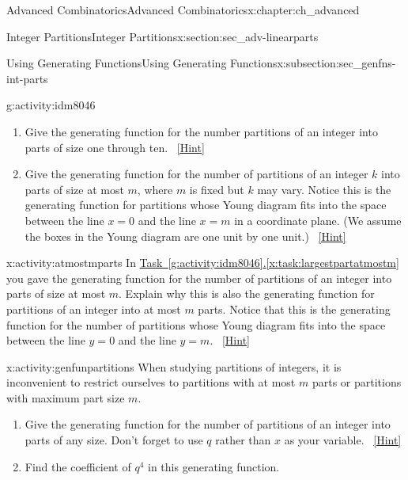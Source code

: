 \documentclass[oneside,10pt,]{book}
\numberwithin{equation}{chapter}
\begin{document}
\begin{chapterptx}{Advanced Combinatorics}{}{Advanced Combinatorics}{}{}{x:chapter:ch_advanced}
\begin{sectionptx}{Integer Partitions}{}{Integer Partitions}{}{}{x:section:sec_adv-linearparts}
\begin{subsectionptx}{Using Generating Functions}{}{Using Generating Functions}{}{}{x:subsection:sec_genfns-int-parts}
\begin{activity}{}{g:activity:idm8046}
\begin{enumerate}[font=\bfseries,label=(\alph*),ref=\alph*]
\item{}Give the generating function for the number partitions of an integer into parts of size one through ten.%
\qquad~\hfill{\tiny\hyperlink{g:hint:idm8059-back}{[Hint]}}\item\label{x:task:largestpartatmostm}Give the generating function for the number of partitions of an integer \(k\) into parts of size at most \(m\), where \(m\) is fixed but \(k\) may vary. Notice this is the generating function for partitions whose Young diagram fits into the space between the line \(x=0\) and the line \(x=m\) in a coordinate plane. (We assume the boxes in the Young diagram are one unit by one unit.)%
\qquad~\hfill{\tiny\hyperlink{g:hint:idm8073-back}{[Hint]}}\end{enumerate}
\end{activity}
%
\begin{activity}{}{x:activity:atmostmparts}%
In \hyperref[x:task:largestpartatmostm]{Task~\ref{g:activity:idm8046}.\ref{x:task:largestpartatmostm}} you gave the generating function for the number of partitions of an integer into parts of size at most \(m\). Explain why this is also the generating function for partitions of an integer into at most \(m\) parts. Notice that this is the generating function for the number of partitions whose Young diagram fits into the space between the line \(y=0\) and the line \(y=m\).%
\qquad~\hfill{\tiny\hyperlink{g:hint:idm8087-back}{[Hint]}}\end{activity}
\begin{activity}{}{x:activity:genfunpartitions}%
When studying partitions of integers, it is inconvenient to restrict ourselves to partitions with at most \(m\) parts or partitions with maximum part size \(m\).%
\begin{enumerate}[font=\bfseries,label=(\alph*),ref=\alph*]
\item{}Give the generating function for the number of partitions of an integer into parts of any size. Don't forget to use \(q\) rather than \(x\) as your variable.%
\qquad~\hfill{\tiny\hyperlink{g:hint:idm8111-back}{[Hint]}}\item{}Find the coefficient of \(q^4\) in this generating function.%

\end{enumerate}
\end{activity}
\end{subsectionptx}
\end{sectionptx}
\end{chapterptx}
\end{document}

